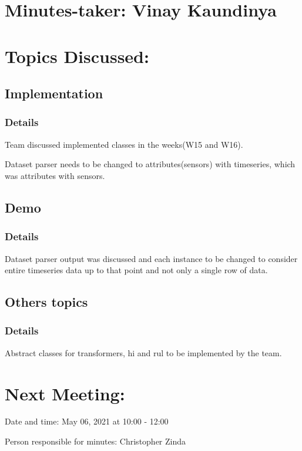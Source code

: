 \documentclass[11pt]{meetingmins} %
\begin{document}
\maketitle

\section{Minutes-taker: Vinay Kaundinya}

\section{Topics Discussed:}

\subsection{Implementation}
\subsubsection{Details}
\begin{hiddensubitems}
	\item Team discussed implemented classes in the weeks(W15 and W16). 
	\item Dataset parser needs to be changed to attributes(sensors) with timeseries, which was attributes with sensors.
\end{hiddensubitems}

\subsection{Demo}
\subsubsection{Details}
\begin{hiddensubitems}
    \item Dataset parser output was discussed and each instance to be changed to consider entire timeseries data up to that point and not only a single row of data.
\end{hiddensubitems}

\subsection{Others topics}
\subsubsection{Details}
\begin{hiddensubitems}
    \item Abstract classes for transformers, hi and rul to be implemented by the team.
\end{hiddensubitems}

\section{Next Meeting:}
\begin{hiddensubitems}
    \item Date and time: May 06, 2021 at 10:00 - 12:00
    \item Person responsible for minutes: Christopher Zinda
\end{hiddensubitems}
\end{document}
